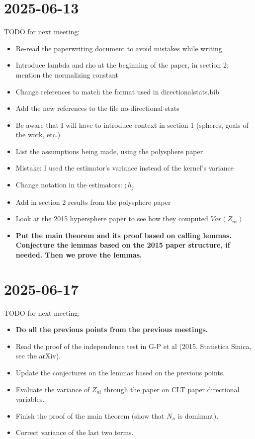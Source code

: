 \documentclass{article}
\begin{document}
\section*{2025-06-13}

TODO for next meeting:
\begin{itemize}
    \item [$\checkmark$] Re-read the paperwriting document to avoid mistakes while writing
    \item [$\checkmark$] Introduce lambda and rho at the beginning of the paper, in section 2; mention the normalizing constant
    \item [$\checkmark$]Change references to match the format used in directionalstats.bib
    \item [$\checkmark$]Add the new references to the file no-directional-stats
    \item [$\checkmark$] Be aware that I will have to introduce context in section 1 (spheres, goals of the work, etc.)
    \item [$\checkmark$] List the assumptions being made, using the polysphere paper
    \item [$\checkmark$] Mistake: I used the estimator’s variance instead of the kernel’s variance
    \item [$\checkmark$]Change notation in the estimators: $;h_j$
    \item [$\checkmark$]Add in section 2 results from the polysphere paper
    \item [$\checkmark$] Look at the 2015 hypersphere paper to see how they computed $Var(Z_{ni})$
    \item [$\checkmark$] \textbf{Put the main theorem and its proof based on calling lemmas. Conjecture the lemmas based on the 2015 paper structure, if needed. Then we prove the lemmas.}
\end{itemize}

\section*{2025-06-17}

TODO for next meeting:
\begin{itemize}
    \item \textbf{Do all the previous points from the previous meetings.}
    \item [$\checkmark$] Read the proof of the independence test in G-P et al (2015, Statistica Sinica, see the arXiv).
    \item [$\checkmark$] Update the conjectures on the lemmas based on the previous points.
    \item [$\checkmark$] Evaluate the variance of $Z_{ni}$ through the paper on CLT paper directional variables.
    \item [$\checkmark$] Finish the proof of the main theorem (show that $N_n$ is dominant).
    \item [$\checkmark$] Correct variance of the last two terms.
\end{itemize}
\end{document}

